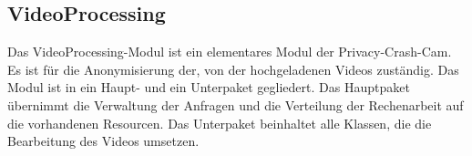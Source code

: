 \subsection{VideoProcessing} \label{service:modul:VideoProcessing}
Das VideoProcessing-Modul ist ein elementares Modul der Privacy-Crash-Cam. Es ist für die Anonymisierung der, von der  hochgeladenen Videos zuständig.\newline
Das Modul ist in ein Haupt- und ein Unterpaket gegliedert. Das Hauptpaket übernimmt die Verwaltung der Anfragen und die Verteilung der Rechenarbeit auf die vorhandenen Resourcen. Das Unterpaket  beinhaltet alle Klassen, die die Bearbeitung des Videos umsetzen.
